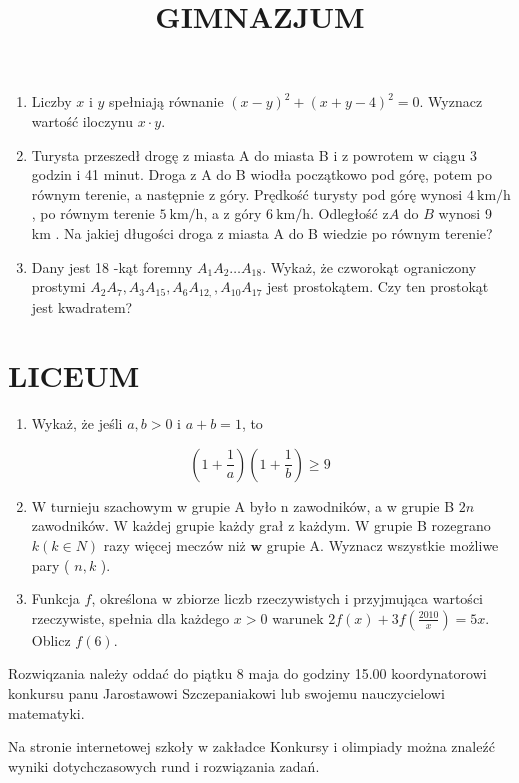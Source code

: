 \documentclass[10pt]{article}
\title{GIMNAZJUM }
\author{}
\date{}
\begin{document}
\maketitle
\begin{enumerate}
  \item Liczby \(x\) i \(y\) spełniają równanie \((x-y)^{2}+(x+y-4)^{2}=0\). Wyznacz wartość iloczynu \(x \cdot y\).
  \item Turysta przeszedł drogę z miasta A do miasta B i z powrotem w ciągu 3 godzin i 41 minut. Droga z A do B wiodła początkowo pod górę, potem po równym terenie, a następnie z góry. Prędkość turysty pod górę wynosi \(4 \mathrm{~km} / \mathrm{h}\), po równym terenie \(5 \mathrm{~km} / \mathrm{h}\), a z góry \(6 \mathrm{~km} / \mathrm{h}\). Odległość \(\mathrm{z} A\) do \(B\) wynosi 9 km . Na jakiej długości droga z miasta A do B wiedzie po równym terenie?
  \item Dany jest 18 -kąt foremny \(A_{1} A_{2} \ldots A_{18}\). Wykaż, że czworokąt ograniczony prostymi \(A_{2} A_{7}, A_{3} A_{15}, A_{6} A_{12,}, A_{10} A_{17}\) jest prostokątem. Czy ten prostokąt jest kwadratem?
\end{enumerate}

\section*{LICEUM}
\begin{enumerate}
  \item Wykaż, że jeśli \(a, b>0\) i \(a+b=1\), to
\end{enumerate}

\[
\left(1+\frac{1}{a}\right)\left(1+\frac{1}{b}\right) \geq 9
\]

\begin{enumerate}
  \setcounter{enumi}{1}
  \item W turnieju szachowym w grupie A było n zawodników, a w grupie B \(2 n\) zawodników. W każdej grupie każdy grał z każdym. W grupie B rozegrano \(k(k \in N)\) razy więcej meczów niż \(\mathbf{w}\) grupie A. Wyznacz wszystkie możliwe pary ( \(n, k\) ).
  \item Funkcja \(f\), określona w zbiorze liczb rzeczywistych i przyjmująca wartości rzeczywiste, spełnia dla każdego \(x>0\) warunek \(2 f(x)+3 f\left(\frac{2010}{x}\right)=5 x\). Oblicz \(f(6)\).
\end{enumerate}

Rozwiqzania należy oddać do piątku 8 maja do godziny 15.00 koordynatorowi konkursu panu Jarostawowi Szczepaniakowi lub swojemu nauczycielowi matematyki.

Na stronie internetowej szkoły w zakładce Konkursy i olimpiady można znaleźć wyniki dotychczasowych rund i rozwiązania zadań.
\end{document}
